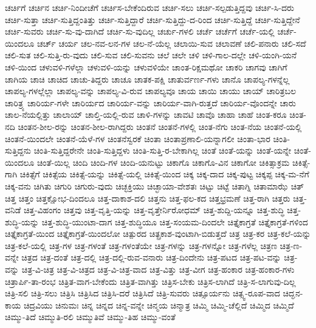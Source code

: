 {ಚರ್ಚಿಗೆ
ಚರ್ಚಿನ
ಚರ್ಚಿ-ನಿಂದೀಚೆಗೆ
ಚರ್ಚಿಸ-ಬೇಕೆಂದಿರುವ
ಚರ್ಚಿ-ಸಲು
ಚರ್ಚಿ-ಸಲ್ಪಡುತ್ತಿದ್ದವು
ಚರ್ಚಿ-ಸಿ-ದರು
ಚರ್ಚಿ-ಸುತ್ತಾ
ಚರ್ಚಿ-ಸುತ್ತಿದ್ದಂತಿತ್ತು
ಚರ್ಚಿ-ಸುತ್ತಿದ್ದಾರೆ
ಚರ್ಚಿ-ಸುತ್ತಿದ್ದು-ದ-ರಿಂದ
ಚರ್ಚಿ-ಸುತ್ತಿದ್ದೆ
ಚರ್ಚಿ-ಸುತ್ತಿದ್ದೇನೆ
ಚರ್ಚಿ-ಸುವರು
ಚರ್ಚಿ-ಸು-ವು-ದಾಗಿದೆ
ಚರ್ಚಿ-ಸು-ವುದಿಲ್ಲ
ಚರ್ಚು-ಗಳಲಿ
ಚರ್ಚೆ
ಚರ್ಚೆಗೆ
ಚರ್ಚೆ-ಯಲ್ಲಿ
ಚರ್ಚೆ-ಯಿಂದಲೂ
ಚರ್ಚ್
ಚರ್ಯ
ಚಲ-ನವ-ಲನ-ಗಳ
ಚಲ-ನೆ-ಯೆಲ್ಲ
ಚಲಾಯಿ-ಸುವ
ಚಲಾವಣೆ
ಚಲಿ-ಪನಾರು
ಚಲಿ-ಸದೆ
ಚಲಿ-ಸುತ
ಚಲಿ-ಸುತ್ತಿ-ರು-ವುದು
ಚಲಿ-ಸುವ
ಚಲಿ-ಸುವನು
ಚಲೆ
ಚಲೇ
ಚಳಿ
ಚಳಿ-ಗಾಲ-ದಲ್ಲೇ
ಚಳಿ-ಯಂಗಿ-ಯನೆ
ಚಳಿ-ಯಿಂದ
ಚಳುವಳಿ-ಗಳೆಲ್ಲಾ
ಚಳುವಳಿ-ಯನ್ನು
ಚಳುವಳಿಯೇ
ಚಾಂತ-ರಿಕ್ಷಮಥೋ
ಚಾಕರಿ
ಚಾಗವು
ಚಾಗಿಗೆ
ಚಾಗಿಯ
ಚಾಚಿ
ಚಾಚಿದ
ಚಾಚು-ತಿದ್ದರು
ಚಾಚೂ
ಚಾತಕ-ಪಕ್ಷಿ
ಚಾತುರ್ವರ್ಣ-ಗಳು
ಚಾನೊ
ಚಾಪಲ್ಯ-ಗಳನ್ನೆಲ್ಲ
ಚಾಪಲ್ಯ-ಗಳಲ್ಲೆಲ್ಲಾ
ಚಾಪಲ್ಯ-ವನ್ನು
ಚಾಪಲ್ಯ-ವಿ-ರುವ
ಚಾಪಲ್ಯವೂ
ಚಾಯ
ಚಾಯಿ
ಚಾಯು
ಚಾಯ್
ಚಾರಿತ್ರಬಲ
ಚಾರಿತ್ರ್ಯ
ಚಾರಿರ್ಯ-ಗಳೇ
ಚಾರಿರ್ಯದ
ಚಾರಿರ್ಯ-ವನ್ನು
ಚಾರಿರ್ಯ-ವಾಗಿ-ರುತ್ತದೆ
ಚಾರಿರ್ಯ-ವೊಂದನ್ನೇ
ಚಾರು
ಚಾಲ-ನೆಯಲ್ಲಿತ್ತು
ಚಾಲಾಯ್
ಚಾಲ್ತಿ-ಯಲ್ಲಿ-ರುವ
ಚಾಳಿ-ಗಳನ್ನು
ಚಾವಟಿ
ಚಾವೊ
ಚಾಹಾ
ಚಾಹೆ
ಚಿಂತ-ಕರೂ
ಚಿಂತ-ನದಿ
ಚಿಂತನ-ಶೀಲ-ರನ್ನು
ಚಿಂತನ-ಶೀಲ-ರಾಗಿದ್ದರು
ಚಿಂತನೆ
ಚಿಂತನೆ-ಗಳಲ್ಲಿ
ಚಿಂತ-ನೆಗು
ಚಿಂತ-ನೆಯ
ಚಿಂತನೆ-ಯಲ್ಲಿ
ಚಿಂತನೆ-ಯಿಂದಲೇ
ಚಿಂತನೆ-ಯೆಳೆ-ಗಳ
ಚಿಂತನೆಸ್ವರಕೆ
ಚಿಂತಾ
ಚಿಂತಾಪ್ರಣಾಲಿ-ಯನ್ನಾಗಲೀ
ಚಿಂತಾ-ಭಾರ
ಚಿಂತಿ-ಸುತ್ತಿದ್ದನು
ಚಿಂತಿ-ಸುತ್ತಿದ್ದರೇನೇ
ಚಿಂತಿ-ಸುತ್ತಿದ್ದಳು
ಚಿಂತಿ-ಸುತ್ತಿ-ರ-ಬೇಕಾಗಿಲ್ಲ
ಚಿಂತೆ
ಚಿಂತೆ-ಯನ್ನು
ಚಿಂತೆ-ಯನ್ನೇ
ಚಿಂತೆ-ಯಿಂದಲೂ
ಚಿಂತೆ-ಯಿಲ್ಲ
ಚಿಂದಿ
ಚಿಂದಿ-ಗಳ
ಚಿಂದಿ-ಯನುಟ್ಟು
ಚಿಕಾಗೊ
ಚಿಕಾಗೊ-ವಿನ
ಚಿಕಾಗೋ
ಚಿಕಿತ್ಸಾಕ್ರಮ
ಚಿಕಿತ್ಸೆ-ಗಾಗಿ
ಚಿಕಿತ್ಸೆಗೆ
ಚಿಕಿತ್ಸೆಯ
ಚಿಕಿತ್ಸೆ-ಯನ್ನು
ಚಿಕಿತ್ಸೆ-ಯಲ್ಲಿ
ಚಿಕಿತ್ಸೆ-ಯಿಂದ
ಚಿಕ್ಕ
ಚಿಕ್ಕ-ದಾದ
ಚಿಕ್ಕ-ಪುಟ್ಟ
ಚಿಕ್ಕಪ್ಪ
ಚಿಕ್ಕ-ಮ-ನೆಗೆ
ಚಿಕ್ಕ-ವನು
ಚಿಗಿತು
ಚಿಗುರಿ
ಚಿಗುರು-ವುದು
ಚಿಚ್ಛಕ್ತಿಯು
ಚಿಚ್ಛಾಯಾ-ವೇಶತಃ
ಚಿಟ್ಟು
ಚಿಟ್ಟೆ
ಚಿತಾಗ್ನಿ
ಚಿತಾಮಾಝೆ
ಚಿತ್
ಚಿತ್ತ
ಚಿತ್ತಂ
ಚಿತ್ತಕ್ಷೋಭ-ದಿಂದಲೂ
ಚಿತ್ತ-ದಾಕಾಶ-ದಲಿ
ಚಿತ್ತನು
ಚಿತ್ತ-ಫಲ-ಕದ
ಚಿತ್ತಭ್ರಮಣೆ
ಚಿತ್ತ-ರಾಗಿ
ಚಿತ್ತರು
ಚಿತ್ತ-ವನಿಡೆ
ಚಿತ್ತ-ವಿಹಂಗಂ
ಚಿತ್ತವು
ಚಿತ್ತ-ವೃತ್ತಿ-ಯನ್ನು
ಚಿತ್ತ-ವೃತ್ತೇರ್ನಿರೋಧಮ್
ಚಿತ್ತ-ಶುದ್ದಿ-ಯನ್ನೂ
ಚಿತ್ತ-ಶುದ್ಧಿ
ಚಿತ್ತ-ಶುದ್ಧಿ-ಯನ್ನು
ಚಿತ್ತ-ಶುದ್ಧಿ-ಯುಂಟಾ-ದಾಗ
ಚಿತ್ತ-ಶುದ್ಧಿಯೂ
ಚಿತ್ತ-ಸಂಯಮ-ದಿಂದಲೇ
ಚಿತ್ತೈಕಾಗ್ರತೆ
ಚಿತ್ತೈಕಾಗ್ರತೆ-ಗಳಿಂದ
ಚಿತ್ತೈಕಾಗ್ರತೆ-ಯಿಂದ
ಚಿತ್ತೈಕಾಗ್ರತೆ-ಯಿಂದಲೋ
ಚಿತ್ಪುರದ
ಚಿತ್ಪ್ರಕಾಶ-ವುಂಟಾಗಿ-ಬಿಡುತ್ತದೆ
ಚಿತ್ರ
ಚಿತ್ರ-ಕರ
ಚಿತ್ರ-ಕಲೆ-ಯನ್ನು
ಚಿತ್ರ-ಕಲೆ-ಯಲ್ಲಿ
ಚಿತ್ರ-ಗಳ
ಚಿತ್ರ-ಗಳಂತೆ
ಚಿತ್ರ-ಗಳಂತೆಯೇ
ಚಿತ್ರ-ಗಳನ್ನು
ಚಿತ್ರ-ಗಳನ್ನೋ
ಚಿತ್ರ-ಗಳೆಲ್ಲ
ಚಿತ್ರಣ
ಚಿತ್ರ-ಣ-ವನ್ನೇ
ಚಿತ್ರದ
ಚಿತ್ರ-ದಂತೆ
ಚಿತ್ರ-ದಲ್ಲಿ
ಚಿತ್ರ-ದಲ್ಲಿ-ರುವ-ವನಾರು
ಚಿತ್ರ-ದಿಂದೇನು
ಚಿತ್ರ-ಪಟದ
ಚಿತ್ರ-ಪಟ-ವನ್ನು
ಚಿತ್ರ-ವನ್ನು
ಚಿತ್ರ-ವಿ-ಚಿತ್ರ
ಚಿತ್ರ-ವಿ-ಚಿತ್ರದ
ಚಿತ್ರ-ವಿ-ಚಿತ್ರ-ವಾದ
ಚಿತ್ರ-ವಿತ್ತು
ಚಿತ್ರ-ವೀಗ
ಚಿತ್ರ-ಹಂಕಾರ
ಚಿತ್ರ-ಹಂಕಾರ-ಗಳು
ಚಿತ್ರಾರ್ಪಿ-ತಾ-ರಂಭ
ಚಿತ್ರಿತ-ವಾಗ-ಬೇಕೆಂದು
ಚಿತ್ರಿತ-ವಾಗಿತ್ತು
ಚಿತ್ರಿಸ-ಬೇಕು
ಚಿತ್ರಿಸ-ಲಾಗಿದೆ
ಚಿತ್ರಿ-ಸ-ಲಾಗುವು-ದಿಲ್ಲ
ಚಿತ್ರಿ-ಸಲಿ
ಚಿತ್ರಿ-ಸಲು
ಚಿತ್ರಿಸಿ
ಚಿತ್ರಿಸಿದ
ಚಿತ್ರಿಸಿ-ದರೆ
ಚಿತ್ರಿಸಿದೆ
ಚಿತ್ರಿ-ಸುವರು
ಚಿತ್ಸೂರ್ಯನು
ಚಿತ್ಸ್ವ-ರೂಪ-ವಾದ
ಚಿದ್ಘನ-ಕಾಯ
ಚಿದ್ರವಿಯು
ಚಿನುಮಃ
ಚಿನ್ನ
ಚಿನ್ನದ
ಚಿನ್ನ-ವನ್ನೇ
ಚಿನ್ಮಯ
ಚಿನ್ಮಾತ್ರ
ಚಿಮ್ಮಿ
ಚಿಮ್ಮಿ-ಚೆಲ್ಲಿದೆ
ಚಿಮ್ಮಿದ
ಚಿಮ್ಮಿದೆ
ಚಿಮ್ಮು-ತಿದೆ
ಚಿಮ್ಮುತಿ-ರಲಿ
ಚಿಮ್ಮುತಿವೆ
ಚಿಮ್ಮು-ತಿಹ
ಚಿಮ್ಮು-ವಂತೆ
}
